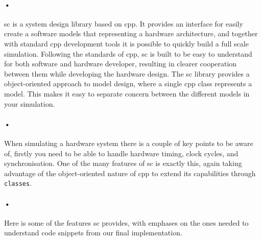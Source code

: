 \documentclass[a4paper]{report}
\newcommand{\codeword}[1]{\texttt{#1}}
\begin{document}
\paragraph{•}
\gls{sc} is a system design library based on \gls{cpp}. 
It provides an interface for easily create a software models that representing a hardware architecture, and together with standard \gls{cpp} development tools it is possible to quickly build a full scale simulation.
Following the standards of \gls{cpp}, \gls{sc} is built to be easy to understand for both software and hardware developer, resulting in clearer cooperation between them while developing the hardware design.
The \gls{sc} library provides a object-oriented approach to model design, where a single \gls{cpp} class represents a model.
This makes it easy to separate concern between the different models in your simulation.
\paragraph{•}
When simulating a hardware system there is a couple of key points to be aware of, firstly you need to be able to handle hardware timing, clock cycles, and synchronisation.
One of the many features of \gls{sc} is exactly this, again taking advantage of the object-oriented nature of \gls{cpp} to extend its capabilities through \codeword{classes}.

\paragraph{•}
Here is some of the features \gls{sc} provides, with emphases on the ones needed to understand code snippets from our final implementation.
\end{document}
